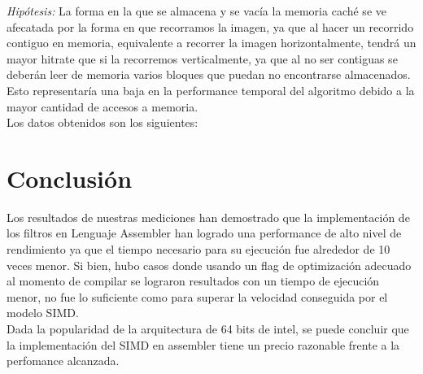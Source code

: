 \documentclass[10pt,a4paper,spanish]{article}
\begin{document}
\textit{Hipótesis:} La forma en la que se almacena y se vacía la memoria caché se ve afecatada por la forma en que recorramos la imagen, ya que al hacer un recorrido contiguo en memoria, equivalente a recorrer la imagen horizontalmente, tendrá un mayor hitrate que si la recorremos verticalmente, ya que al no ser contiguas se deberán leer de memoria varios bloques que puedan no encontrarse almacenados. Esto representaría una baja en la performance temporal del algoritmo debido a la mayor cantidad de accesos a memoria. \\

Los datos obtenidos son los siguientes: \\

\begin{center}
\end{center}

\section{Conclusión}

Los resultados de nuestras mediciones han demostrado que la implementación de los filtros en Lenguaje Assembler han logrado una performance de alto nivel de rendimiento ya que el tiempo necesario para su ejecución fue alrededor de 10 veces menor. Si bien, hubo casos donde usando un flag de optimización adecuado al momento de compilar se lograron resultados con un tiempo de ejecución menor, no fue lo suficiente como para superar la velocidad conseguida por el modelo SIMD. \\

Dada la popularidad de la arquitectura de 64 bits de intel, se puede concluir que la implementación del SIMD en assembler tiene un precio razonable frente a la perfomance alcanzada.\\
\end{document}
